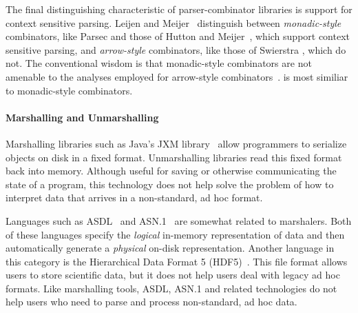 The final distinguishing characteristic of parser-combinator libraries is support for context sensitive parsing. Leijen and Meijer~\cite{leijen+:parsec} distinguish between \textit{monadic-style} combinators, like Parsec and those of Hutton and Meijer~\cite{hutton+:monadic-parsing}, which support context sensitive parsing, and \textit{arrow-style} combinators, like those of Swierstra \etal{}, which do not. The conventional wisdom is that monadic-style combinators are not amenable to the analyses employed for arrow-style combinators~\cite{leijen+:parsec,swierstra+:deterministic-error-correcting}. \ddc{} is most similiar to monadic-style combinators.


\paragraph*{Marshalling and Unmarshalling}

Marshalling libraries such as Java's JXM library~\cite{jxm} 
allow programmers to
 serialize objects on disk in a fixed format.
Unmarshalling libraries read this fixed format back 
into memory.  Although useful for saving or otherwise communicating 
the state of a program, 
this technology does not help solve the problem of how to interpret
data that arrives in a non-standard, ad hoc format.

Languages such as
\textsc{ASDL}~\cite{asdl} and \textsc{ASN.1}~\cite{asn}
are somewhat related to marshalers.  Both of
these languages specify the {\em logical\/} in-memory representation of
data and then automatically generate a {\em physical\/} on-disk
representation.  Another language in this category is the Hierarchical Data
Format 5 (HDF5)~\cite{hdf5}.  This file format allows users to store
scientific data, but it does not help users deal with legacy ad hoc
formats.  Like marshalling tools, ASDL, ASN.1 and related technologies
do not help users who need to parse and process non-standard, ad hoc data.


